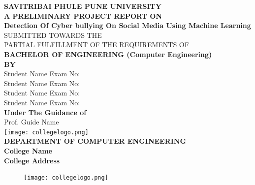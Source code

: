 \documentclass[oneside,a4paper,12pt]{report}
\begin{document}
\setlength{\parindent}{0mm}
\begin{center}
{\bfseries SAVITRIBAI PHULE PUNE UNIVERSITY \\}
 \vspace*{1\baselineskip}
{\bfseries A PRELIMINARY PROJECT REPORT ON \\}
 \vspace*{2\baselineskip}
{\bfseries \fontsize{16}{12} \selectfont Detection Of Cyber bullying On Social Media Using Machine Learning \\ \vspace*{2\baselineskip}}
{\fontsize{12}{12} \selectfont SUBMITTED TOWARDS THE
 \\PARTIAL FULFILLMENT OF THE REQUIREMENTS OF \\

\vspace*{2\baselineskip}}
{\bfseries \fontsize{14}{12} \selectfont BACHELOR OF ENGINEERING (Computer
Engineering) \\
\vspace*{1\baselineskip}} 
{\bfseries \fontsize{14}{12} \selectfont BY \\ 
\vspace*{1\baselineskip}} 
Student Name  \hspace{25 mm} Exam No:  \\
Student Name \hspace{25 mm} Exam No:   \\
Student Name \hspace{25 mm} Exam No:  \\
Student Name \hspace{25 mm} Exam No:\\
\vspace*{2\baselineskip}
{\bfseries \fontsize{14}{12} \selectfont Under The Guidance of \\  
\vspace*{2\baselineskip}} 
Prof. Guide Name\\
\texttt{[image: collegelogo.png]} \\
{\bfseries \fontsize{14}{12} \selectfont DEPARTMENT OF COMPUTER ENGINEERING \\
College Name \\
College Address 
}
\end{center}

\newpage



\begin{figure}[ht]
\centering
\texttt{[image: collegelogo.png]}
\end{figure}
\end{document}
